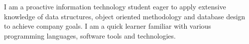

\begin{cvparagraph}
I am a proactive information technology student eager to apply extensive knowledge of data structures, object oriented methodology and database design to achieve company goals. I am a quick learner familiar with various programming languages, software tools and technologies.
\end{cvparagraph}


